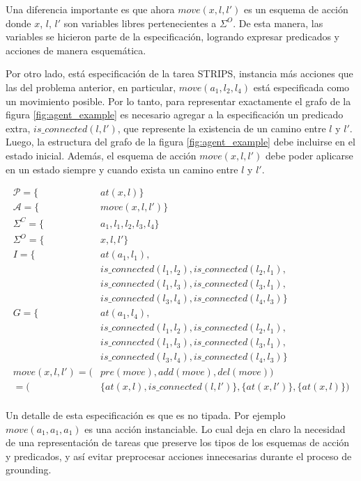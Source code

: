 Una diferencia importante es que ahora $move(x, l, l')$ es un esquema de acción
donde $x$, $l$, $l'$ son variables libres pertenecientes a $\Sigma^{O}$. De esta
manera, las variables se hicieron parte de la especificación, logrando expresar
predicados y acciones de manera esquemática.

Por otro lado, está especificación de la tarea STRIPS, instancia más acciones
que las del problema anterior, en particular, $move(a_1, l_2, l_4)$ está
especificada como un movimiento posible. Por lo tanto, para representar
exactamente el grafo de la figura \ref{fig:agent_example} es necesario agregar a
la especificación un predicado extra, $is\_connected(l, l')$, que represente la
existencia de un camino entre $l$ y $l'$. Luego, la estructura del grafo de la
figura \ref{fig:agent_example} debe incluirse en el estado inicial. Además, el
esquema de acción $move(x, l, l')$ debe poder aplicarse en un estado siempre y
cuando exista un camino entre $l$ y $l'$.

\begin{align*}
    \mathcal{P} = \{&at(x, l)\} \\
    \mathcal{A} = \{&move(x, l, l')\} \\
    \Sigma^{C} = \{&a_1, l_1, l_2, l_3, l_4\} \\
    \Sigma^{O} = \{&x, l, l'\} \\
    I = \{& at(a_1, l_1), \\
          & is\_connected(l_1, l_2), is\_connected(l_2, l_1), \\
          & is\_connected(l_1, l_3), is\_connected(l_3, l_1), \\
          & is\_connected(l_3, l_4), is\_connected(l_4, l_3)\} \\
    G = \{& at(a_1, l_4), \\
          & is\_connected(l_1, l_2), is\_connected(l_2, l_1), \\
          & is\_connected(l_1, l_3), is\_connected(l_3, l_1), \\
          & is\_connected(l_3, l_4), is\_connected(l_4, l_3)\} \\
    move(x, l, l') = (&pre(move), add(move), del(move)) \\
                   = (&\{at(x, l), is\_connected(l, l')\}, \{at(x, l')\},\{at(x, l)\})
\end{align*}
\begin{align*}
\end{align*}

Un detalle de esta especificación es que es no tipada. Por ejemplo $move(a_1,
a_1, a_1)$ es una acción instanciable. Lo cual deja en claro la necesidad de una
representación de tareas que preserve los tipos de los esquemas de acción y
predicados, y así evitar preprocesar acciones innecesarias durante el proceso de
grounding.

